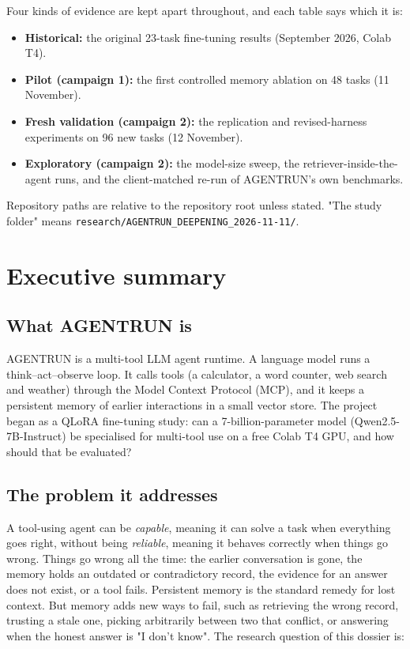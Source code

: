 \documentclass[10.5pt,a4paper,oneside]{report}
\begin{document}
Four kinds of evidence are kept apart throughout, and each table says which it is:

\begin{itemize}
\item \textbf{Historical:} the original 23-task fine-tuning results (September 2026, Colab T4).
\item \textbf{Pilot (campaign 1):} the first controlled memory ablation on 48 tasks (11 November).
\item \textbf{Fresh validation (campaign 2):} the replication and revised-harness experiments on 96 new tasks (12 November).
\item \textbf{Exploratory (campaign 2):} the model-size sweep, the retriever-inside-the-agent runs, and the client-matched re-run of AGENTRUN's own benchmarks.
\end{itemize}
Repository paths are relative to the repository root unless stated. "The study folder" means \texttt{research/\allowbreak{}AGENTRUN\_\allowbreak{}DEEPENING\_\allowbreak{}2026-11-11/\allowbreak{}}.

\clearpage
\chapter{Executive summary}
\section{What AGENTRUN is}
AGENTRUN is a multi-tool LLM agent runtime. A language model runs a think–act–observe loop. It calls tools (a calculator, a word counter, web search and weather) through the Model Context Protocol (MCP), and it keeps a persistent memory of earlier interactions in a small vector store. The project began as a QLoRA fine-tuning study: can a 7-billion-parameter model (Qwen2.5-7B-Instruct) be specialised for multi-tool use on a free Colab T4 GPU, and how should that be evaluated?

\section{The problem it addresses}
A tool-using agent can be \emph{capable}, meaning it can solve a task when everything goes right, without being \emph{reliable}, meaning it behaves correctly when things go wrong. Things go wrong all the time: the earlier conversation is gone, the memory holds an outdated or contradictory record, the evidence for an answer does not exist, or a tool fails. Persistent memory is the standard remedy for lost context. But memory adds new ways to fail, such as retrieving the wrong record, trusting a stale one, picking arbitrarily between two that conflict, or answering when the honest answer is "I don't know". The research question of this dossier is:
\end{document}
